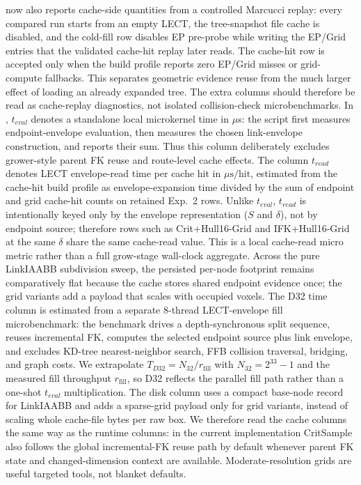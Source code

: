 \documentclass[journal]{IEEEtran}
\begin{document}
 now also reports cache-side quantities from a controlled Marcucci
replay: every compared run starts from an empty LECT, the tree-snapshot file
cache is disabled, and the cold-fill row disables EP pre-probe while writing
the EP/Grid entries that the validated cache-hit replay later reads. The
cache-hit row is accepted only when the build profile reports zero EP/Grid
misses or grid-compute fallbacks. This separates geometric evidence reuse from the much larger
effect of loading an already expanded tree. The extra
columns should therefore be read as cache-replay diagnostics, not isolated
collision-check microbenchmarks. In ,
$t_{eval}$ denotes a standalone local microkernel time in $\mu$s: the script
first measures endpoint-envelope evaluation,
then measures the chosen link-envelope construction, and reports their sum. Thus
this column deliberately excludes grower-style parent FK reuse and route-level
cache effects. The column
$t_{read}$ denotes LECT envelope-read time per cache hit in $\mu\mathrm{s}/\mathrm{hit}$,
estimated from the cache-hit build profile as envelope-expansion time divided by
the sum of endpoint and grid cache-hit counts
on retained Exp.~2 rows. Unlike $t_{eval}$, $t_{read}$ is intentionally keyed
only by the envelope representation ($S$ and $\delta$), not by endpoint source;
therefore rows such as Crit+Hull16-Grid and IFK+Hull16-Grid at the same
$\delta$ share the same cache-read value. This is a local cache-read micro
metric rather than a full grow-stage wall-clock aggregate. Across the pure LinkIAABB
subdivision sweep, the persisted per-node footprint remains comparatively flat
because the cache stores shared endpoint evidence once; the grid variants add a
payload that scales with occupied voxels. The D32 time column is estimated from
a separate 8-thread LECT-envelope fill microbenchmark: the benchmark drives a
depth-synchronous split sequence, reuses incremental FK, computes the selected
endpoint source plus link envelope, and excludes KD-tree nearest-neighbor
search, FFB collision traversal, bridging, and graph costs. We extrapolate
$T_{D32}=N_{32}/r_{\mathrm{fill}}$ with $N_{32}=2^{33}-1$ and the measured
fill throughput $r_{\mathrm{fill}}$, so D32 reflects the parallel fill path
rather than a one-shot $t_{eval}$ multiplication. The disk column uses a compact base-node record
for LinkIAABB and adds a sparse-grid payload only for grid variants, instead of
scaling whole cache-file bytes per raw box. We
therefore read the cache columns the same way as the runtime columns:
in the current implementation CritSample also follows the global incremental-FK
reuse path by default whenever parent FK state and changed-dimension context are available.
Moderate-resolution grids are useful targeted tools, not blanket defaults.
\end{document}
